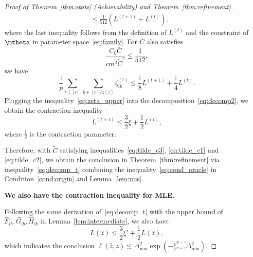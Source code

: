 \documentclass[lettersize,onecolumn,journal]{IEEEtran}
\theoremstyle{definition}
\theoremstyle{definition}
\newcommand{\of}[1]{\left(#1\right)}
\def\fixme#1#2{\textbf{\color{red}[FIXME (#1): #2]}}
\begin{document}
\begin{proof}[Proof of Theorem~\ref{thm:stats} (Achievability) and Theorem~\ref{thm:refinement}]
\begin{align}
         & \leq \frac{1}{512} (L^{(t+1)} + L^{(t)}), \label{eq:g_sum}
    \end{align}
    where the last inequality follows from the definition of $L^{(t)}$ and the constraint of $\mtheta$ in parameter space~\eqref{eq:family}. 
   For $\tilde C$ also satisfies 
    \begin{equation}\label{eq:tilde_c3}
         \frac{C_0 \bar C}{c m^2 \tilde C^2} \leq \frac{1}{512},
    \end{equation}
    we have 
    \begin{equation}\label{eq:zeta_upper}
        \frac{1}{p}\sum_{i \in [p] }  \sum_{b \in [r]/z(i)}  \zeta_{ib}^{(t)} \leq  \frac{1}{8} L^{(t+1)}  + \frac{1}{4} L^{(t)}.
    \end{equation}
    Plugging the inequality~\eqref{eq:zeta_upper} into the decomposition~\eqref{eq:decomp2}, we obtain the contraction inequality 
    \begin{equation}\label{eq:decomp_t}
          L^{(t+1)} \leq \frac{3}{2} \xi  + \frac{1}{2} L^{(t)},
    \end{equation}
     where $\frac{1}{2}$ is the contraction parameter. 
     
     Therefore, with $\tilde C$ satisfying inequalities~\eqref{eq:tilde_c3}, \eqref{eq:tilde_c1} and \eqref{eq:tilde_c2}, we obtain the conclusion in Theorem~\ref{thm:refinement} via inequality~\eqref{eq:decomp_t} combining the inequality~\eqref{eq:cond_oracle} in Condition~\ref{cond:origin} and Lemma~\ref{lem:mis}.
     
     {
     \color{blue}
     \textbf{We also have the contraction inequality for MLE.}
     
     Following the same derivation of~\eqref{eq:decomp_t} with the upper bound of $\hat F_{ib}, \hat G_{ib}, \hat H_{ib}$ in Lemma~\ref{lem:intermediate}, we also have
    \begin{equation}\label{eq:decomp_t}
          L(\hat z) \leq \frac{3}{2} \xi'  + \frac{1}{2} L(\hat z),
    \end{equation}
    which indicates the conclusion $\ell(\hat z,z) \lesssim \Delta_{\min}^2  \exp \of{ - \frac{p^{K-1}}{r^{K-1}} \Delta_{\min}^2  }$.
     }
     
     
    

\end{proof}
\end{document}
